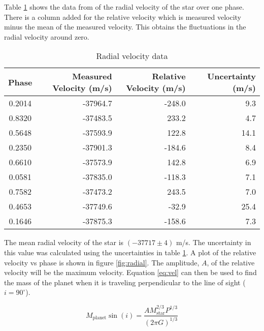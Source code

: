 \documentclass[10pt]{article}
\begin{document}
\noindent Table \ref{tab:radial} shows the data from \cite[p.4]{Alsubai_2011} of the radial velocity of the star over one phase. There is a column added for the relative velocity which is measured velocity minus the mean of the measured velocity. This obtains the fluctuations in the radial velocity around zero.
\begin{table}[!htb]
\centering
\caption{Radial velocity data}
\begin{tabular}{crrr}
\toprule
Phase &  Measured Velocity (m/s) &  Relative Velocity (m/s) &  Uncertainty (m/s) \\
\midrule
0.2014 &                 -37964.7 &              -248.0 &             9.3 \\
0.8320 &                 -37483.5 &               233.2 &             4.7 \\
0.5648 &                 -37593.9 &               122.8 &            14.1 \\
0.2350 &                 -37901.3 &              -184.6 &             8.4 \\
0.6610 &                 -37573.9 &               142.8 &             6.9 \\
0.0581 &                 -37835.0 &              -118.3 &             7.1 \\
0.7582 &                 -37473.2 &               243.5 &             7.0 \\
0.4653 &                 -37749.6 &               -32.9 &            25.4 \\
0.1646 &                 -37875.3 &              -158.6 &             7.3 \\
\bottomrule
\end{tabular}
\label{tab:radial}
\end{table}

\noindent The mean radial velocity of the star is $(-37717\pm 4)$ m/s. The uncertainty in this value was calculated using the uncertainties in table \ref{tab:radial}. A plot of the relative velocity vs phase is shown in figure \ref{fig:radial}. The amplitude, $A$, of the relative velocity will be the maximum velocity. Equation \ref{eq:vel} can then be used to find the mass of the planet when it is traveling perpendicular to the line of sight ($i = 90^\circ$).

\begin{equation}
	M_{\text{planet}} \sin(i) = \frac{A M_{\text{star}}^{2/3} P^{1/3}}{(2 \pi G)^{1/3}}
	\label{eq:vel}
\end{equation}
\end{document}
